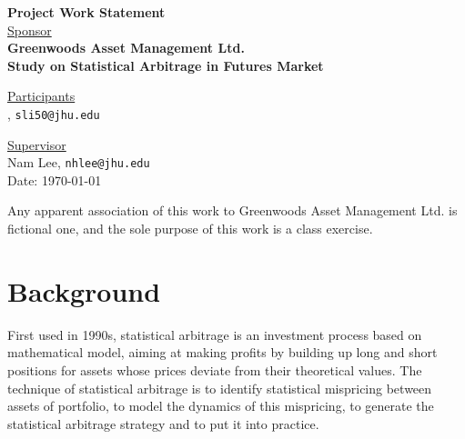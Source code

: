 \documentclass[12pt,letterpaper]{article}
\theoremstyle{definition}
\begin{document}
\def\shiftdowna{0.32in}  %
\def\shiftdownb{0.22in}  %


\begin{center}
\textbf{{\large Project Work Statement}}\\


\vspace \shiftdowna
\underline {Sponsor}\\ 
\vspace{5pt}
\textbf{{\large Greenwoods Asset Management Ltd.}}\\


\vspace \shiftdowna
\textbf{{\large Study on Statistical Arbitrage in Futures Market}}


\vspace{0.35in}
\vspace \shiftdownb
\underline {Participants} \\
\vspace{5pt}
, \texttt{sli50@jhu.edu}

\vspace \shiftdownb
\underline {Supervisor}\\
\vspace{5pt}
Nam Lee, \texttt{nhlee@jhu.edu} \\


\vspace \shiftdowna
Date: \today

\end{center}

\vfill  
\footnoterule
\noindent \small{Any apparent association of this work to Greenwoods Asset Management Ltd. is
fictional one, and the sole purpose of this work is a class exercise.}

\newpage

\section{Background} 
     \noindent First used in 1990s, statistical arbitrage is an investment process based on mathematical model, aiming at making profits by building up long and short positions for assets whose prices deviate from their theoretical values. The technique of statistical arbitrage is to identify statistical mispricing between assets of portfolio, to model the dynamics of this mispricing, to generate the statistical arbitrage strategy and to put it into practice.
\end{document}
